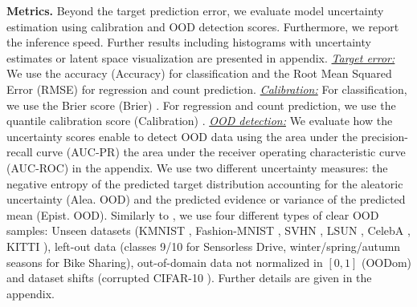 \textbf{Metrics.} Beyond the target prediction error, we evaluate model uncertainty estimation using calibration and OOD detection scores. Furthermore, we report the inference speed. Further results including histograms with uncertainty estimates or latent space visualization are presented in appendix. \textit{\underline{Target error:}} We use the accuracy (Accuracy) for classification and the Root Mean Squared Error (RMSE) for regression and count prediction. \textit{\underline{Calibration:}} For classification, we use the Brier score (Brier) \citep{scoring-rules}. For regression and count prediction, we use the quantile calibration score (Calibration) \citep{accurate-uncertainties-deep-learning-regression}. \textit{\underline{OOD detection:}} We evaluate how the uncertainty scores enable to detect OOD data using the area under the precision-recall curve (AUC-PR) the area under the receiver operating characteristic curve (AUC-ROC) in the appendix. We use two different uncertainty measures: the negative entropy of the predicted target distribution accounting for the aleatoric uncertainty (Alea. OOD) and the predicted evidence or variance of the predicted mean (Epist. OOD). Similarly to \citep{dataset-shift, postnet}, we use four different types of clear OOD samples: Unseen datasets (KMNIST \cite{kmnist}, Fashion-MNIST \citep{fashion-mnist}, SVHN \citep{svhn}, LSUN \citep{lsun}, CelebA \citep{celeba}, KITTI \citep{kitti}), left-out data (classes 9/10 for Sensorless Drive, winter/spring/autumn seasons for Bike Sharing), out-of-domain data not normalized in $[0, 1]$ (OODom) and dataset shifts (corrupted CIFAR-10 \citep{benchmarking-corruptions}). Further details are given in the appendix.

